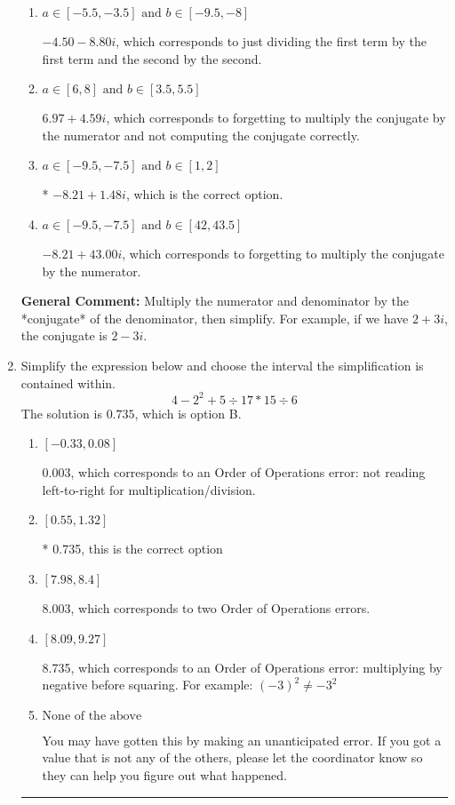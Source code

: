 \documentclass{extbook}[14pt]
\newcommand{\litem}[1]{\item #1

\rule{\textwidth}{0.4pt}}
\begin{document}
\begin{enumerate}
{\begin{enumerate}[label=\Alph*.]
 $-238.00  + 1.48 i$, which corresponds to forgetting to multiply the conjugate by the numerator and using a plus instead of a minus in the denominator.
\item \( a \in [-5.5, -3.5] \text{ and } b \in [-9.5, -8] \)

 $-4.50  - 8.80 i$, which corresponds to just dividing the first term by the first term and the second by the second.
\item \( a \in [6, 8] \text{ and } b \in [3.5, 5.5] \)

 $6.97  + 4.59 i$, which corresponds to forgetting to multiply the conjugate by the numerator and not computing the conjugate correctly.
\item \( a \in [-9.5, -7.5] \text{ and } b \in [1, 2] \)

* $-8.21  + 1.48 i$, which is the correct option.
\item \( a \in [-9.5, -7.5] \text{ and } b \in [42, 43.5] \)

 $-8.21  + 43.00 i$, which corresponds to forgetting to multiply the conjugate by the numerator.
\end{enumerate}

\textbf{General Comment:} Multiply the numerator and denominator by the *conjugate* of the denominator, then simplify. For example, if we have $2+3i$, the conjugate is $2-3i$.
}
\litem{
Simplify the expression below and choose the interval the simplification is contained within.
\[ 4 - 2^2 + 5 \div 17 * 15 \div 6 \]The solution is \( 0.735 \), which is option B.\begin{enumerate}[label=\Alph*.]
\item \( [-0.33, 0.08] \)

 0.003, which corresponds to an Order of Operations error: not reading left-to-right for multiplication/division.
\item \( [0.55, 1.32] \)

* 0.735, this is the correct option
\item \( [7.98, 8.4] \)

 8.003, which corresponds to two Order of Operations errors.
\item \( [8.09, 9.27] \)

 8.735, which corresponds to an Order of Operations error: multiplying by negative before squaring. For example: $(-3)^2 \neq -3^2$
\item \( \text{None of the above} \)

 You may have gotten this by making an unanticipated error. If you got a value that is not any of the others, please let the coordinator know so they can help you figure out what happened.
\end{enumerate}

}
\end{enumerate}
\end{document}
